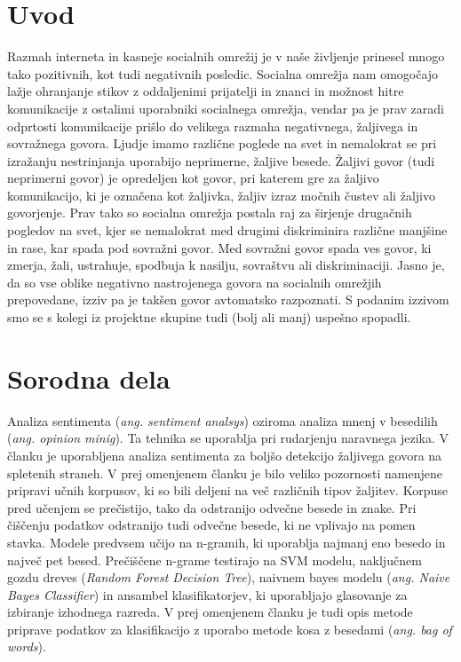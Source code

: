 \documentclass{acm_proc_article-sp}
\begin{document}

\section{Uvod}
Razmah interneta in kasneje socialnih omrežij je v naše življenje prinesel mnogo tako pozitivnih, kot tudi negativnih posledic. 
Socialna omrežja nam omogočajo lažje ohranjanje stikov z oddaljenimi prijatelji in znanci in možnost hitre komunikacije z ostalimi uporabniki socialnega omrežja, vendar pa je prav zaradi odprtosti komunikacije prišlo do velikega razmaha negativnega, žaljivega in sovražnega govora.
Ljudje imamo različne poglede na svet in nemalokrat se pri izražanju nestrinjanja uporabijo neprimerne, žaljive besede. Žaljivi govor (tudi neprimerni govor) je opredeljen kot govor, pri katerem gre za žaljivo komunikacijo, ki je označena kot žaljivka, žaljiv izraz močnih čustev ali žaljivo govorjenje.
Prav tako so socialna omrežja postala raj za širjenje drugačnih pogledov na svet, kjer se nemalokrat med drugimi diskriminira različne manjšine in rase, kar spada pod sovražni govor.
Med sovražni govor spada ves govor, ki zmerja, žali, ustrahuje, spodbuja k nasilju, sovraštvu ali diskriminaciji. Jasno je, da so vse oblike negativno nastrojenega govora na socialnih omrežjih prepovedane, izziv pa je takšen govor avtomatsko razpoznati.
S podanim izzivom smo se s kolegi iz projektne skupine tudi (bolj ali manj) uspešno spopadli.

\section{Sorodna dela}
Analiza sentimenta ({\it ang. sentiment analsys}) oziroma analiza mnenj v besedilih ({\it ang. opinion minig}).
Ta tehnika se uporablja pri rudarjenju naravnega jezika.
V članku \cite{POI3:POI385} je uporabljena analiza sentimenta za boljšo detekcijo žaljivega govora na spletenih straneh.
V prej omenjenem članku je bilo veliko pozornosti namenjene pripravi učnih korpusov, ki so bili deljeni na več različnih tipov žaljitev.
Korpuse pred učenjem se prečistijo, tako da odstranijo odvečne besede in znake.
Pri čiščenju podatkov odstranijo tudi odvečne besede, ki ne vplivajo na pomen stavka.
Modele predvsem učijo na n-gramih, ki uporablja najmanj eno besedo in največ pet besed.
Prečiščene n-grame testirajo na SVM modelu, naključnem gozdu dreves ({\it Random Forest Decision Tree}), naivnem bayes modelu ({\it ang. Naive Bayes Classifier}) in ansambel klasifikatorjev, ki uporabljajo glasovanje za izbiranje izhodnega razreda.
V prej omenjenem članku je tudi opis metode priprave podatkov za klasifikacijo z uporabo metode kosa z besedami ({\it ang. bag of words}).
\end{document}
